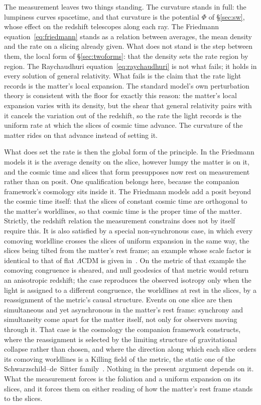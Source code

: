 \documentclass[11pt,a4paper]{article}
\begin{document}
The measurement leaves two things standing. The curvature stands in full: the lumpiness curves spacetime, and that curvature is the potential $\Phi$ of \S\ref{sec:sw}, whose effect on the redshift telescopes along each ray. The Friedmann equation~\eqref{eq:friedmann} stands as a relation between averages, the mean density and the rate on a slicing already given. What does not stand is the step between them, the local form of \S\ref{sec:twoforms}: that the density sets the rate region by region. The Raychaudhuri equation~\eqref{eq:raychaudhuri} is not what fails; it holds in every solution of general relativity. What fails is the claim that the rate light records is the matter's local expansion. The standard model's own perturbation theory is consistent with the floor for exactly this reason: the matter's local expansion varies with its density, but the shear that general relativity pairs with it cancels the variation out of the redshift, so the rate the light records is the uniform rate at which the slices of cosmic time advance. The curvature of the matter rides on that advance instead of setting it.

What does set the rate is then the global form of the principle. In the Friedmann models it is the average density on the slice, however lumpy the matter is on it, and the cosmic time and slices that form presupposes now rest on measurement rather than on posit. One qualification belongs here, because the companion framework's cosmology sits inside it. The Friedmann models add a posit beyond the cosmic time itself: that the slices of constant cosmic time are orthogonal to the matter's worldlines, so that cosmic time is the proper time of the matter. Strictly, the redshift relation the measurement constrains does not by itself require this. It is also satisfied by a special non-synchronous case, in which every comoving worldline crosses the slices of uniform expansion in the same way, the slices being tilted from the matter's rest frame; an example whose scale factor is identical to that of flat $\Lambda$CDM is given in~\cite{Janzen2015}. On the metric of that example the comoving congruence is sheared, and null geodesics of that metric would return an anisotropic redshift; the case reproduces the observed isotropy only when the light is assigned to a different congruence, the worldlines at rest in the slices, by a reassignment of the metric's causal structure. Events on one slice are then simultaneous and yet asynchronous in the matter's rest frame: synchrony and simultaneity come apart for the matter itself, not only for observers moving through it. That case is the cosmology the companion framework constructs, where the reassignment is selected by the limiting structure of gravitational collapse rather than chosen, and where the direction along which each slice orders its comoving worldlines is a Killing field of the metric, the static one of the Schwarzschild--de~Sitter family~\cite{JanzenCRframework}. Nothing in the present argument depends on it. What the measurement forces is the foliation and a uniform expansion on its slices, and it forces them on either reading of how the matter's rest frame stands to the slices.
\end{document}
